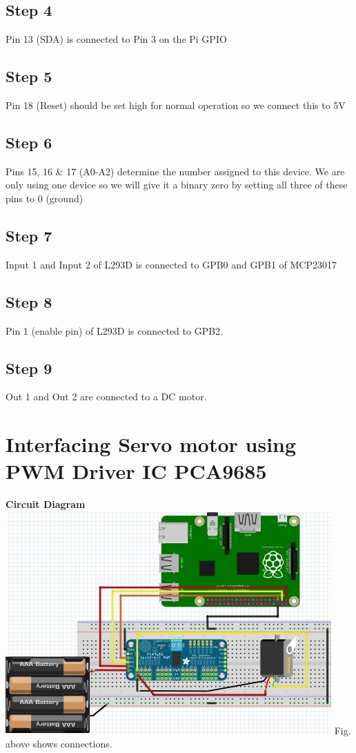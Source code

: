 \documentclass[a4paper,12pt,oneside]{book}
\begin{document}
\subsection*{Step 4}
Pin 13 (SDA) is connected to Pin 3 on the Pi GPIO
\subsection*{Step 5}
Pin 18 (Reset) should be set high for normal operation so we connect
this to 5V
\subsection*{Step 6}
Pins 15, 16 \& 17 (A0-A2) determine the number assigned to this device. We are only using one device so we will give it a binary zero by setting all three of these pins to 0 (ground)
\subsection*{Step 7}
Input 1 and Input 2 of L293D is connected to GPB0 and GPB1 of MCP23017
\subsection*{Step 8}
Pin 1 (enable pin) of L293D is connected to GPB2.
\subsection*{Step 9}
Out 1 and Out 2 are connected to a DC motor.
\section{Interfacing Servo motor using PWM Driver IC PCA9685}
\textbf{Circuit Diagram}\\
\centering 
\includegraphics[scale=0.6]{servo_motor_PCA9685}
\flushleft
Fig. above shows connections.
\end{document}

